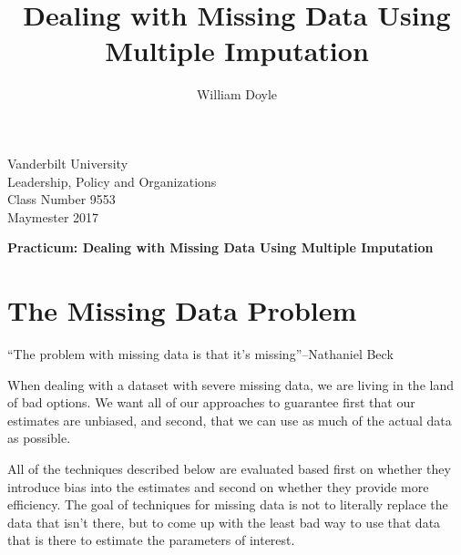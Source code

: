 \documentclass[12 pt]{article}
\title{Dealing with Missing Data Using Multiple Imputation}
\author{William Doyle}
\begin{document}
\thispagestyle{empty}%

\setlength{\parskip}{1ex plus 0.5ex minus 0.2ex}

\setcounter{secnumdepth}{-2}


\begin{flushleft}
  Vanderbilt University\\Leadership, Policy and Organizations\\Class Number 9553\\ Maymester 2017\\
\end{flushleft}

\begin{center}
\textbf{Practicum: Dealing with Missing Data Using Multiple Imputation}
\end{center}

\section{The Missing Data Problem}
\label{sec:misss-data-probl}

``The problem with missing data is that it's missing''--Nathaniel Beck

When dealing with a dataset with severe missing data, we are living in
the land of bad options. We want all of our approaches to guarantee
first that our estimates are unbiased, and second, that we can use as
much of the actual data as possible. 

All of the techniques described below are evaluated based first on
whether they introduce bias into the estimates and second on whether
they provide more efficiency.  The goal of techniques for missing data
is not to literally replace the data that isn't there, but to come up
with the least bad way to use that data that is there to estimate the
parameters of interest.
\end{document}
